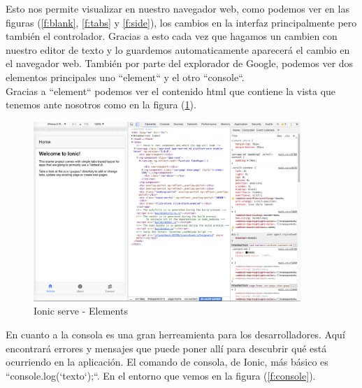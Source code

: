 \documentclass[a4paper, 11pt]{article}
\begin{document}
\begin{itemize}
            Esto nos permite visualizar en nuestro navegador web, como podemos
            ver en las figuras (\ref{f:blank}, \ref{f:tabs} y \ref{f:side}), los
            cambios en la interfaz principalmente pero también el controlador.
            Gracias a esto cada vez que hagamos un cambien con nuestro editor de
            texto y lo guardemos automaticamente aparecerá el cambio en el
            navegador web. También por parte del explorador de Google, podemos
            ver dos elementos principales uno ``element`` y el otro ``console``.\\

            Gracias a ``element`` podemos ver el contenido html que contiene la
            vista que tenemos ante nosotros como en la figura (\ref{f:element}).\\

            \begin{figure}[H]
              \centering
                   \includegraphics[width=0.9\textwidth]{elements}
                   \caption{Ionic serve - Elements}
                   \label{f:element}
             \end{figure}

             En cuanto a la consola es una gran herreamienta para los
             desarrolladores. Aquí encontrará errores y mensajes que puede poner
             allí para descubrir qué está ocurriendo en la aplicación. El comando
             de consola, de Ionic, más básico es ``console.log(`texto`);``. En el
             entorno que vemos en la figura (\ref{f:console}).\\


\end{itemize}
\end{document}
